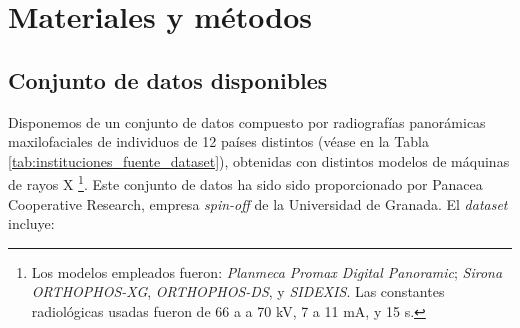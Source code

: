 \chapter{Materiales y métodos} 


\section{Conjunto de datos disponibles}

Disponemos de un conjunto de datos compuesto por radiografías panorámicas maxilofaciales de individuos de 12 países distintos (véase en la Tabla \ref{tab:instituciones_fuente_dataset}), obtenidas con distintos modelos de máquinas de rayos X%
\footnote{
    Los modelos empleados fueron: \textit{Planmeca Promax Digital Panoramic}; \textit{Sirona ORTHOPHOS-XG}, \textit{ORTHOPHOS-DS}, y \textit{SIDEXIS}. Las constantes radiológicas usadas fueron de 66 a a 70 kV, 7 a 11 mA, y 15 s.
}.
Este conjunto de datos ha sido sido proporcionado por Panacea Cooperative Research, empresa \textit{spin-off} de la Universidad de Granada. El \textit{dataset} incluye:


